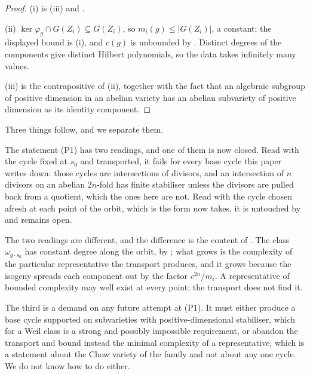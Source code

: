 \begin{proof}
(i) is (iii) and .

(ii) $\ker\varphi_{g}\cap G(Z_{i})\subseteq G(Z_{i})$, so
$m_{i}(g)\le|G(Z_{i})|$, a constant; the displayed bound is (i), and $c(g)$ is
unbounded by . Distinct degrees of the components give
distinct Hilbert polynomials, so the data takes infinitely many values.

(iii) is the contrapositive of (ii), together with the fact that an algebraic
subgroup of positive dimension in an abelian variety has an abelian subvariety
of positive dimension as its identity component.
\end{proof}

\begin{remark}\label{rem:p1meaning}
Three things follow, and we separate them.

The statement (P1) has two readings, and one of them is now closed. Read with
the cycle fixed at $s_{0}$ and transported, it fails for every base cycle this
paper writes down: those cycles are intersections of divisors, and an
intersection of $n$ divisors on an abelian $2n$-fold has finite stabiliser
unless the divisors are pulled back from a quotient, which the ones here are
not. Read with the cycle chosen afresh at each point of the orbit, which is
the form  now takes, it is untouched by
 and remains open.

The two readings are different, and the difference is the content of
. The class $\omega_{g\cdot s_{0}}$ has constant degree
along the orbit, by ; what grows is the complexity
of the particular representative the transport produces, and it grows because
the isogeny spreads each component out by the factor $c^{2n}/m_{i}$. A
representative of bounded complexity may well exist at every point; the
transport does not find it.

The third is a demand on any future attempt at (P1). It must either produce a
base cycle supported on subvarieties with positive-dimensional stabiliser,
which for a Weil class is a strong and possibly impossible requirement, or
abandon the transport and bound instead the minimal complexity of a
representative, which is a statement about the Chow variety of the family and
not about any one cycle. We do not know how to do either.
\end{remark}

